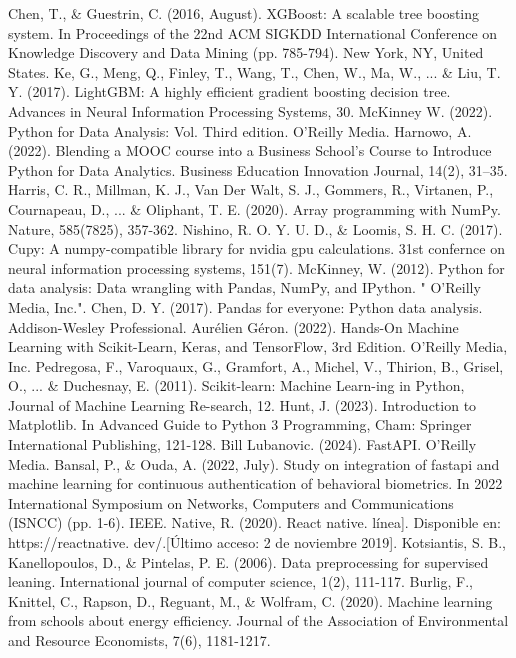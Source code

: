\documentclass[12pt,a4paper]{article}
\begin{document}
\begin{enumerate}
\begin{thebibliography}{99}
 Chen, T., \& Guestrin, C. (2016, August). XGBoost: A scalable tree boosting system. In Proceedings of the 22nd ACM SIGKDD International Conference on Knowledge Discovery and Data Mining (pp. 785-794). New York, NY, United States.
 Ke, G., Meng, Q., Finley, T., Wang, T., Chen, W., Ma, W., ... \& Liu, T. Y. (2017). LightGBM: A highly efficient gradient boosting decision tree. Advances in Neural Information Processing Systems, 30.
 McKinney W. (2022). Python for Data Analysis: Vol. Third edition. O’Reilly Media.
 Harnowo, A. (2022). Blending a MOOC course into a Business School’s Course to Introduce Python for Data Analytics. Business Education Innovation Journal, 14(2), 31–35.
 Harris, C. R., Millman, K. J., Van Der Walt, S. J., Gommers, R., Virtanen, P., Cournapeau, D., ... \& Oliphant, T. E. (2020). Array programming with NumPy. Nature, 585(7825), 357-362.
 Nishino, R. O. Y. U. D., \& Loomis, S. H. C. (2017). Cupy: A numpy-compatible library for nvidia gpu calculations. 31st confernce on neural information processing systems, 151(7).
 McKinney, W. (2012). Python for data analysis: Data wrangling with Pandas, NumPy, and IPython. " O'Reilly Media, Inc.".
 Chen, D. Y. (2017). Pandas for everyone: Python data analysis. Addison-Wesley Professional.
 Aurélien Géron. (2022). Hands-On Machine Learning with Scikit-Learn, Keras, and TensorFlow, 3rd Edition. O’Reilly Media, Inc.
 Pedregosa, F., Varoquaux, G., Gramfort, A., Michel, V., Thirion, B., Grisel, O., ... \& Duchesnay, E. (2011). Scikit-learn: Machine Learn-ing in Python, Journal of Machine Learning Re-search, 12.
 Hunt, J. (2023). Introduction to Matplotlib. In Advanced Guide to Python 3 Programming, Cham: Springer International Publishing, 121-128.
 Bill Lubanovic. (2024). FastAPI. O’Reilly Media.
 Bansal, P., \& Ouda, A. (2022, July). Study on integration of fastapi and machine learning for continuous authentication of behavioral biometrics. In 2022 International Symposium on Networks, Computers and Communications (ISNCC) (pp. 1-6). IEEE.
 Native, R. (2020). React native. línea]. Disponible en: https://reactnative. dev/.[Último acceso: 2 de noviembre 2019].
 Kotsiantis, S. B., Kanellopoulos, D., \& Pintelas, P. E. (2006). Data preprocessing for supervised leaning. International journal of computer science, 1(2), 111-117.
 Burlig, F., Knittel, C., Rapson, D., Reguant, M., \& Wolfram, C. (2020). Machine learning from schools about energy efficiency. Journal of the Association of Environmental and Resource Economists, 7(6), 1181-1217.

\end{thebibliography}
\end{enumerate}
\end{document}
